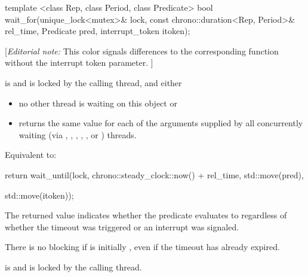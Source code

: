 {\begin{itemdecl}
template <class Rep, class Period, class Predicate>
  bool wait_for(unique_lock<mutex>& lock,
                const chrono::duration<Rep, Period>& rel_time,
                Predicate pred,
                interrupt_token itoken);
\end{itemdecl}
{\color{blue}
[{\itshape{}Editorial note:} {\color{diffcolor}This color signals differences to the corresponding  function without the interrupt token parameter.} ]
}
\begin{itemdescr}
 \pnum \requires {} is  and 
        is locked by the calling thread, and either
        \begin{itemize}
         \item no other thread is waiting on this  object or
         \item {} returns the same value for each of the  arguments
                supplied by all concurrently waiting (via ,
                , ,
                {\color{insertcolor} , , or }) threads.
        \end{itemize}

 \pnum \effects Equivalent to:
\begin{codeblock}
return wait_until(lock, chrono::steady_clock::now() + rel_time, std::move(pred),
\end{codeblock}
{\color{diffcolor}
\begin{codeblock}
                  std::move(itoken));
\end{codeblock}
}

 \pnum \begin{note} The returned value indicates whether the predicate evaluates to 
        regardless of whether the timeout was triggered 
        {\color{diffcolor} or an interrupt was signaled}. \end{note}

 \pnum \begin{note} There is no blocking if  is initially , even if the
        timeout has already expired. \end{note}

 \pnum \postconditions {} is  and 
        is locked by the calling thread.


\end{itemdescr}}
